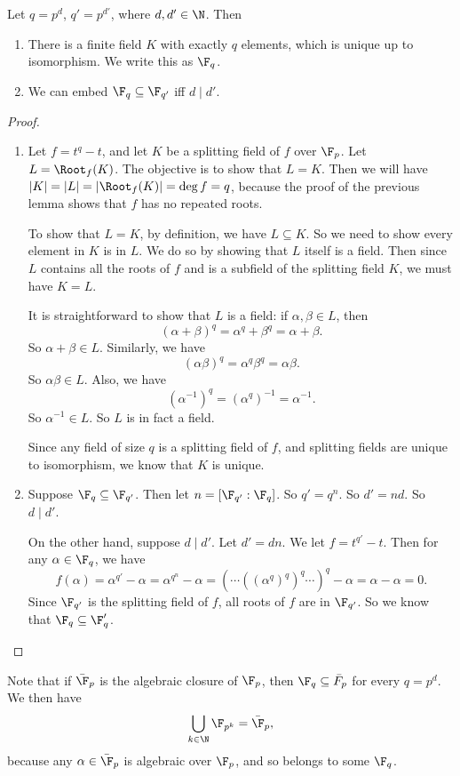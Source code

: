 \documentclass[a4paper]{article}
\begin{document}
\begin{lemma}
  Let $q = p^d$, $q' = p^{d'}$, where $d, d' \in \N$. Then
  \begin{enumerate}
    \item There is a finite field $K$ with exactly $q$ elements, which is unique up to isomorphism. We write this as $\F_q$.
    \item We can embed $\F_q \subseteq \F_{q'}$ iff $d \mid d'$.
  \end{enumerate}
\end{lemma}

\begin{proof}\leavevmode
  \begin{enumerate}
    \item Let $f = t^q - t$, and let $K$ be a splitting field of $f$ over $\F_p$. Let $L = \Root_f(K)$. The objective is to show that $L = K$. Then we will have $|K| = |L| = |\Root_f(K)| = \deg f = q$, because the proof of the previous lemma shows that $f$ has no repeated roots.

      To show that $L = K$, by definition, we have $L \subseteq K$. So we need to show every element in $K$ is in $L$. We do so by showing that $L$ itself is a field. Then since $L$ contains all the roots of $f$ and is a subfield of the splitting field $K$, we must have $K = L$.

      It is straightforward to show that $L$ is a field: if $\alpha, \beta \in L$, then
      \[
        (\alpha + \beta)^q = \alpha^q + \beta^q = \alpha + \beta.
      \]
      So $\alpha + \beta \in L$. Similarly, we have
      \[
        (\alpha\beta)^q = \alpha^q \beta^q = \alpha\beta.
      \]
      So $\alpha\beta \in L$. Also, we have
      \[
        (\alpha^{-1})^q = (\alpha^q)^{-1} = \alpha^{-1}.
      \]
      So $\alpha^{-1} \in L$. So $L$ is in fact a field.

      Since any field of size $q$ is a splitting field of $f$, and splitting fields are unique to isomorphism, we know that $K$ is unique.
    \item Suppose $\F_q \subseteq \F_{q'}$. Then let $n = [\F_{q'}: \F_q]$. So $q' = q^n$. So $d'= nd$. So $d \mid d'$.

      On the other hand, suppose $d \mid d'$. Let $d' = dn$. We let $f = t^{q'} - t$. Then for any $\alpha \in \F_q$, we have
      \[
        f(\alpha) = \alpha^{q'} - \alpha = \alpha^{q^n} - \alpha = (\cdots ((\alpha^q)^q)^q\cdots )^q - \alpha = \alpha - \alpha = 0.
      \]
      Since $\F_{q'}$ is the splitting field of $f$, all roots of $f$ are in $\F_{q'}$. So we know that $\F_q \subseteq \F_q'$.
  \end{enumerate}
\end{proof}
Note that if $\bar{\F}_p$ is the algebraic closure of $\F_p$, then $\F_q \subseteq \bar{F}_p$ for every $q = p^d$. We then have
\[
  \bigcup_{k \in \N} \F_{p^k} = \bar{\F}_p,
\]
because any $\alpha \in \bar{\F}_p$ is algebraic over $\F_p$, and so belongs to some $\F_q$.
\end{document}
